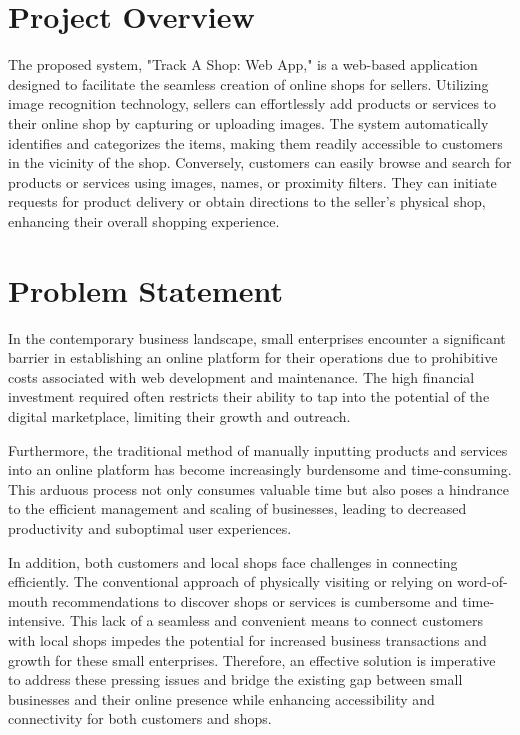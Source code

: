\vspace{0.5cm}
\section{Project Overview}

The proposed system, "Track A Shop: Web App," is a web-based application designed to facilitate the seamless creation of online shops for sellers. Utilizing image recognition technology, sellers can effortlessly add products or services to their online shop by capturing or uploading images. The system automatically identifies and categorizes the items, making them readily accessible to customers in the vicinity of the shop. Conversely, customers can easily browse and search for products or services using images, names, or proximity filters. They can initiate requests for product delivery or obtain directions to the seller's physical shop, enhancing their overall shopping experience.

\vspace{0.5cm}
\section{Problem Statement}
In the contemporary business landscape, small enterprises encounter a significant barrier in establishing an online platform for their operations due to prohibitive costs associated with web development and maintenance. The high financial investment required often restricts their ability to tap into the potential of the digital marketplace, limiting their growth and outreach.

Furthermore, the traditional method of manually inputting products and services into an online platform has become increasingly burdensome and time-consuming. This arduous process not only consumes valuable time but also poses a hindrance to the efficient management and scaling of businesses, leading to decreased productivity and suboptimal user experiences.

In addition, both customers and local shops face challenges in connecting efficiently. The conventional approach of physically visiting or relying on word-of-mouth recommendations to discover shops or services is cumbersome and time-intensive. This lack of a seamless and convenient means to connect customers with local shops impedes the potential for increased business transactions and growth for these small enterprises. Therefore, an effective solution is imperative to address these pressing issues and bridge the existing gap between small businesses and their online presence while enhancing accessibility and connectivity for both customers and shops.

